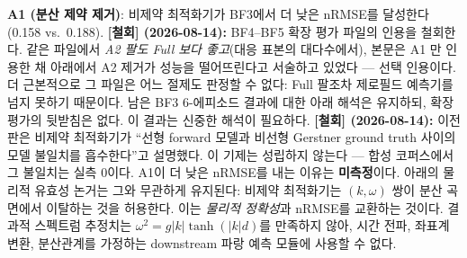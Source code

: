 \documentclass[11pt]{report}
\numberwithin{equation}{chapter}
\numberwithin{figure}{chapter}
\numberwithin{table}{chapter}
\begin{document}
\textbf{A1 (분산 제약 제거)}: 비제약 최적화기가 BF3에서 더 낮은 nRMSE를 달성한다
(0.158 vs.\ 0.188).
\textbf{[철회] (2026-08-14):} BF4--BF5 확장 평가 파일의 인용을 철회한다.
같은 파일에서 \emph{A2 팔도 Full 보다 좋고}(대응 표본의 대다수에서), 본문은 A1 만
인용한 채 아래에서 A2 제거가 성능을 떨어뜨린다고 서술하고 있었다 --- 선택 인용이다.
더 근본적으로 그 파일은 어느 절제도 판정할 수 없다: Full 팔조차 제로필드 예측기를
넘지 못하기 때문이다.
남은 BF3 6-에피소드 결과에 대한 아래 해석은 유지하되, 확장 평가의 뒷받침은 없다.
이 결과는 신중한 해석이 필요하다.
\textbf{[철회] (2026-08-14):} 이전 판은 비제약 최적화기가 ``선형 forward 모델과
비선형 Gerstner ground truth 사이의 모델 불일치를 흡수한다''고 설명했다. 이 기제는
성립하지 않는다 --- 합성 코퍼스에서 그 불일치는 실측 0이다. A1이 더 낮은 nRMSE를
내는 이유는 \textbf{미측정}이다. 아래의 물리적 유효성 논거는 그와 무관하게 유지된다:
비제약 최적화기는 $(k, \omega)$ 쌍이 분산 곡면에서 이탈하는 것을 허용한다.
이는 \emph{물리적 정확성}과 nRMSE를 교환하는 것이다.
결과적 스펙트럼 추정치는 $\omega^2 = g|k|\tanh(|k|d)$를 만족하지 않아,
시간 전파, 좌표계 변환, 분산관계를 가정하는 downstream 파랑 예측 모듈에
사용할 수 없다.
\end{document}
